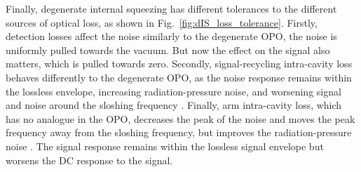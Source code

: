 Finally, degenerate internal squeezing has different tolerances to the different sources of optical loss, as shown in Fig.~\ref{fig:dIS_loss_tolerance}. %
Firstly, detection losses affect the noise similarly to the degenerate OPO, the noise is uniformly pulled towards the vacuum. But now the effect on the signal also matters, which is pulled towards zero. Secondly, signal-recycling intra-cavity loss behaves differently to the degenerate OPO, as the noise response remains within the lossless envelope, increasing radiation-pressure noise, and worsening signal and noise around the sloshing frequency . Finally, arm intra-cavity loss, which has no analogue in the OPO, decreases the peak of the noise and moves the peak frequency away from the sloshing frequency, but improves the radiation-pressure noise . The signal response remains within the lossless signal envelope but worsens the DC response to the signal.


